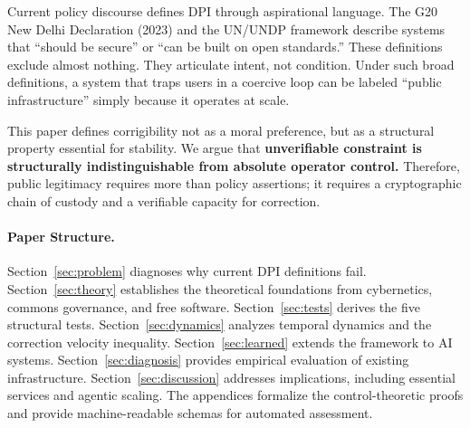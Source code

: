 \documentclass{article}
\begin{document}
Current policy discourse defines DPI through aspirational language. The G20 New Delhi Declaration (2023) and the UN/UNDP framework \citep{undp} describe systems that ``should be secure'' or ``can be built on open standards.'' These definitions exclude almost nothing. They articulate intent, not condition. Under such broad definitions, a system that traps users in a coercive loop can be labeled ``public infrastructure'' simply because it operates at scale.

This paper defines corrigibility not as a moral preference, but as a structural property essential for stability. We argue that \textbf{unverifiable constraint is structurally indistinguishable from absolute operator control.} Therefore, public legitimacy requires more than policy assertions; it requires a cryptographic chain of custody and a verifiable capacity for correction.

\paragraph{Paper Structure.} Section~\ref{sec:problem} diagnoses why current DPI definitions fail. Section~\ref{sec:theory} establishes the theoretical foundations from cybernetics, commons governance, and free software. Section~\ref{sec:tests} derives the five structural tests. Section~\ref{sec:dynamics} analyzes temporal dynamics and the correction velocity inequality. Section~\ref{sec:learned} extends the framework to AI systems. Section~\ref{sec:diagnosis} provides empirical evaluation of existing infrastructure. Section~\ref{sec:discussion} addresses implications, including essential services and agentic scaling. The appendices formalize the control-theoretic proofs and provide machine-readable schemas for automated assessment.
\end{document}
